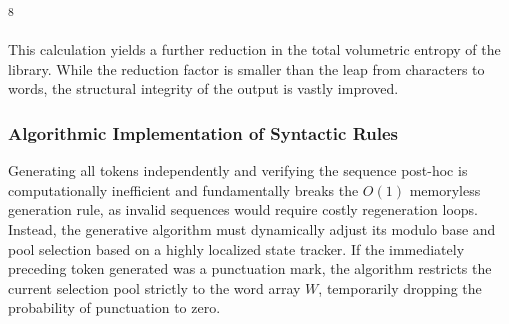 \documentclass[
  11pt,
  a4paper,
]{article}
\begin{document}
\textsuperscript{8}

This calculation yields a further reduction in the total volumetric entropy of the library. While the reduction factor is smaller than the leap from characters to words, the structural integrity of the output is vastly improved.

\subsubsection{Algorithmic Implementation of Syntactic Rules}\label{algorithmic-implementation-of-syntactic-rules}

Generating all tokens independently and verifying the sequence post-hoc is computationally inefficient and fundamentally breaks the \(O(1)\) memoryless generation rule, as invalid sequences would require costly regeneration loops. Instead, the generative algorithm must dynamically adjust its modulo base and pool selection based on a highly localized state tracker. If the immediately preceding token generated was a punctuation mark, the algorithm restricts the current selection pool strictly to the word array \(W\), temporarily dropping the probability of punctuation to zero.
\end{document}
